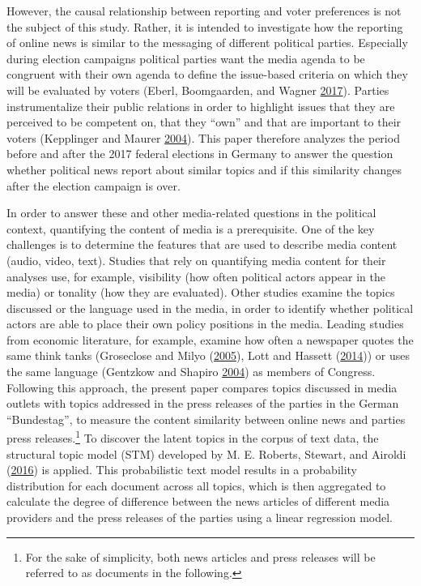 \documentclass[
]{article}
\begin{document}
However, the causal relationship between reporting and voter preferences
is not the subject of this study. Rather, it is intended to investigate
how the reporting of online news is similar to the messaging of
different political parties. Especially during election campaigns
political parties want the media agenda to be congruent with their own
agenda to define the issue-based criteria on which they will be
evaluated by voters (Eberl, Boomgaarden, and Wagner
\protect\hyperlink{ref-eberl_one_2017}{2017}). Parties instrumentalize
their public relations in order to highlight issues that they are
perceived to be competent on, that they ``own'' and that are important
to their voters (Kepplinger and Maurer
\protect\hyperlink{ref-kepplinger_einfluss_2004}{2004}). This paper
therefore analyzes the period before and after the 2017 federal
elections in Germany to answer the question whether political news
report about similar topics and if this similarity changes after the
election campaign is over.

In order to answer these and other media-related questions in the
political context, quantifying the content of media is a prerequisite.
One of the key challenges is to determine the features that are used to
describe media content (audio, video, text). Studies that rely on
quantifying media content for their analyses use, for example,
visibility (how often political actors appear in the media) or tonality
(how they are evaluated). Other studies examine the topics discussed or
the language used in the media, in order to identify whether political
actors are able to place their own policy positions in the media.
Leading studies from economic literature, for example, examine how often
a newspaper quotes the same think tanks (Groseclose and Milyo
(\protect\hyperlink{ref-groseclose_measure_2005}{2005}), Lott and
Hassett (\protect\hyperlink{ref-lott_is_2014}{2014})) or uses the same
language (Gentzkow and Shapiro
\protect\hyperlink{ref-gentzkow_media_2004}{2004}) as members of
Congress. Following this approach, the present paper compares topics
discussed in media outlets with topics addressed in the press releases
of the parties in the German ``Bundestag'', to measure the content
similarity between online news and parties press releases.\footnote{For
  the sake of simplicity, both news articles and press releases will be
  referred to as documents in the following.} To discover the latent
topics in the corpus of text data, the structural topic model (STM)
developed by M. E. Roberts, Stewart, and Airoldi
(\protect\hyperlink{ref-roberts_model_2016}{2016}) is applied. This
probabilistic text model results in a probability distribution for each
document across all topics, which is then aggregated to calculate the
degree of difference between the news articles of different media
providers and the press releases of the parties using a linear
regression model.
\end{document}
